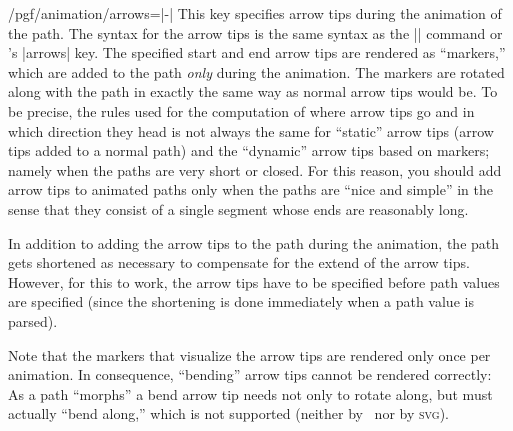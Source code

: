 \begin{key}{/pgf/animation/arrows=|-|}
    This key specifies arrow tips during the animation of the path. The syntax
    for the arrow tips is the same syntax as the |\pgfsetarrow| command or
    \tikzname's |arrows| key.  The specified start and end arrow tips are
    rendered as ``markers,'' which are added to the path \emph{only} during the
    animation. The markers are rotated along with the path in exactly the  same
    way as normal arrow tips would be. To be precise, the rules used for the
    computation of where arrow tips go and in which direction they head is not
    always the same for ``static'' arrow tips (arrow tips added to a normal
    path) and the ``dynamic'' arrow tips based on markers; namely when the
    paths are very short or closed. For this reason, you should add arrow tips
    to animated paths only when the paths are ``nice and simple'' in the sense
    that they consist of a single segment whose ends are reasonably long.

    In addition to adding the arrow tips to the path during the animation, the
    path gets shortened as necessary to compensate for the extend of the arrow
    tips. However, for this to work, the arrow tips have to be specified before
    path values are specified (since the shortening is done immediately when a
    path value is parsed).
\begin{codeexample}[animation list={0,1,2,3,4},animation bb={(0.9,-0.1)rectangle(2.1,1.1)}]
\end{codeexample}

    Note that the markers that visualize the arrow tips are rendered only once
    per animation. In consequence, ``bending'' arrow tips cannot be rendered
    correctly: As a path ``morphs'' a bend arrow tip needs not only to rotate
    along, but must actually ``bend along,'' which is not supported (neither by
    \pgfname\ nor by \textsc{svg}).


\end{key}
